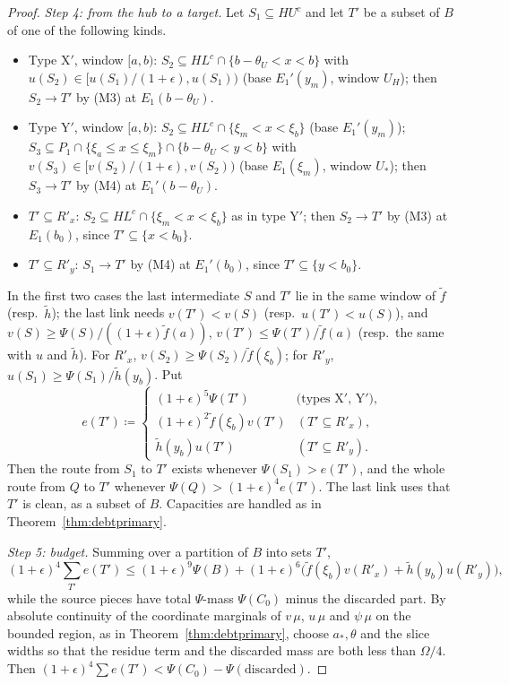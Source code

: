 \documentclass[11pt]{article}
\theoremstyle{definition}\newtheorem{definition}[theorem]{Definition}
\theoremstyle{remark}\newtheorem{remark}[theorem]{Remark}
\newcommand{\ftil}{\tilde f}
\newcommand{\htil}{\tilde h}
\begin{document}
\begin{proof}
\emph{Step 4: from the hub to a target.} Let $S_1\subseteq HU^c$ and let $T'$
be a subset of $B$ of one of the following kinds.
\begin{itemize}[leftmargin=*,itemsep=2pt]
\item Type X$'$, window $[a,b)$: $S_2\subseteq HL^c\cap\{b-\theta_U<x<b\}$
with $u(S_2)\in[u(S_1)/(1+\epsilon),u(S_1))$ (base $E_1'(y_m)$, window
$U_H$); then $S_2\to T'$ by (M3) at $E_1(b-\theta_U)$.
\item Type Y$'$, window $[a,b)$: $S_2\subseteq HL^c\cap\{\xi_m<x<\xi_b\}$
(base $E_1'(y_m)$); $S_3\subseteq P_1\cap\{\xi_a\le x\le\xi_m\}\cap
\{b-\theta_U<y<b\}$ with $v(S_3)\in[v(S_2)/(1+\epsilon),v(S_2))$ (base
$E_1(\xi_m)$, window $U_*$); then $S_3\to T'$ by (M4) at $E_1'(b-\theta_U)$.
\item $T'\subseteq R'_x$: $S_2\subseteq HL^c\cap\{\xi_m<x<\xi_b\}$ as in
type Y$'$; then $S_2\to T'$ by (M3) at $E_1(b_0)$, since
$T'\subseteq\{x<b_0\}$.
\item $T'\subseteq R'_y$: $S_1\to T'$ by (M4) at $E_1'(b_0)$, since
$T'\subseteq\{y<b_0\}$.
\end{itemize}
In the first two cases the last intermediate $S$ and $T'$ lie in the same
window of $\ftil$ (resp.\ $\htil$); the last link needs $v(T')<v(S)$
(resp.\ $u(T')<u(S)$), and
$v(S)\ge\Psi(S)/((1+\epsilon)\ftil(a))$, $v(T')\le\Psi(T')/\ftil(a)$
(resp.\ the same with $u$ and $\htil$). For
$R'_x$, $v(S_2)\ge\Psi(S_2)/\ftil(\xi_b)$; for $R'_y$,
$u(S_1)\ge\Psi(S_1)/\htil(y_b)$. Put
\[
 e(T')\coloneqq
 \begin{cases}
 (1+\epsilon)^5\Psi(T') & \text{(types X$'$, Y$'$)},\\
 (1+\epsilon)^2\ftil(\xi_b)v(T') & (T'\subseteq R'_x),\\
 \htil(y_b)u(T') & (T'\subseteq R'_y).
 \end{cases}
\]
Then the route from $S_1$ to $T'$ exists whenever $\Psi(S_1)>e(T')$, and the
whole route from $Q$ to $T'$ whenever $\Psi(Q)>(1+\epsilon)^4e(T')$. The last
link uses that $T'$ is clean, as a subset of $B$. Capacities are handled as
in Theorem~\ref{thm:debtprimary}.

\emph{Step 5: budget.} Summing over a partition of $B$ into sets $T'$,
\[
 (1+\epsilon)^4\sum_{T'}e(T')\le(1+\epsilon)^9\Psi(B)+(1+\epsilon)^6
 \bigl(\ftil(\xi_b)v(R'_x)+\htil(y_b)u(R'_y)\bigr),
\]
while the source pieces have total $\Psi$-mass $\Psi(C_0)$ minus the
discarded part. By absolute continuity of the coordinate marginals of $v\,\mu$,
$u\,\mu$ and $\psi\,\mu$ on the bounded region, as in
Theorem~\ref{thm:debtprimary}, choose $a_*,\theta$ and the slice widths so
that the residue term and the discarded mass are both less than $\Omega/4$.
Then $(1+\epsilon)^4\sum e(T')<\Psi(C_0)-\Psi(\text{discarded})$.


\end{proof}
\end{document}
